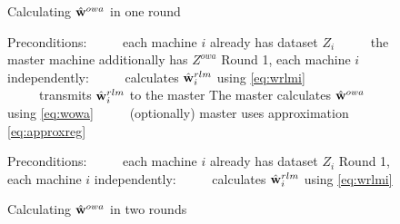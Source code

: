 \documentclass[thesis.tex]{subfiles}
\newcommand{\Zowa}{Z^{\textit{owa}}}
\begin{document}
\begin{figure}[t]

\begin{algorithm}[H]
\caption{Calculating $\hat{\mathbf w}^{owa}$ in one round}
\label{alg:distributed}
\begin{algorithmic}
    \State \hspace{-0.1in}Preconditions: 
    \State \hspace{-0.1in}~~~~~each machine $i$ already has dataset $Z_i$
    \State \hspace{-0.1in}~~~~~the master machine additionally has $\Zowa$
    \State \hspace{-0.1in}Round 1, each machine $i$ independently:
    \State \hspace{-0.1in}~~~~~calculates $\hat{\mathbf w}^{rlm}_i$ using \eqref{eq:wrlmi}
    \State \hspace{-0.1in}~~~~~transmits $\hat{\mathbf w}^{rlm}_i$ to the master
    \State \hspace{-0.1in}The master calculates $\hat{\mathbf w}^{owa}$ using \eqref{eq:wowa} %
    \State \hspace{-0.1in}~~~~~(optionally) master uses approximation \eqref{eq:approxreg}
\end{algorithmic}
\label{fig:alg1}
\end{algorithm}
\vspace{-0.25in}
\begin{algorithm}[H]
\caption{Calculating $\hat{\mathbf w}^{owa}$ in two rounds}
\label{alg:distributed}
\begin{algorithmic}
    \State \hspace{-0.1in}Preconditions:
    \State \hspace{-0.1in}~~~~~each machine $i$ already has dataset $Z_i$
    \State \hspace{-0.1in}Round 1, each machine $i$ independently:
    \State \hspace{-0.1in}~~~~~calculates $\hat{\mathbf w}^{rlm}_i$ using \eqref{eq:wrlmi}

\end{algorithmic}
\end{algorithm}
\end{figure}
\end{document}

